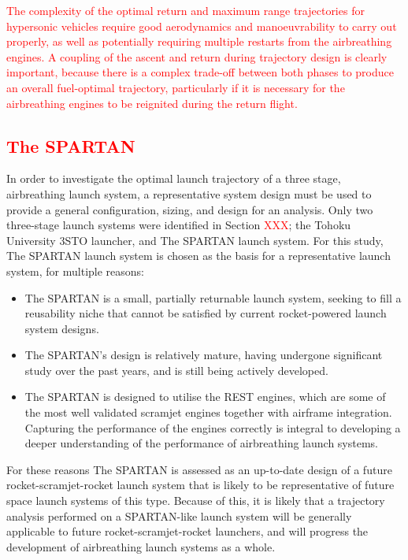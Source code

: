 \textcolor{red}{
The complexity of the optimal return and maximum range trajectories for hypersonic vehicles require good aerodynamics and manoeuvrability to carry out properly, as well as potentially requiring multiple restarts from the airbreathing engines.
	A coupling of the ascent and return during trajectory design is clearly important, because there is a complex trade-off between both phases to produce an overall fuel-optimal trajectory, particularly if it is necessary for the airbreathing engines to be reignited during the return flight. 
}




\textcolor{red}{
\section{The SPARTAN}
}


In order to investigate the optimal launch trajectory of a three stage, airbreathing launch system, a representative system design must be used to provide a general configuration, sizing, and design for an analysis. Only two three-stage launch systems were identified in Section \textcolor{red}{XXX}; the Tohoku University 3STO launcher, and The SPARTAN launch system. For this study, The SPARTAN launch system is chosen as the basis for a representative launch system, for multiple reasons:
\begin{itemize}
	\item The SPARTAN is a small, partially returnable launch system, seeking to fill a reusability niche that cannot be satisfied by current rocket-powered launch system designs.
	\item The SPARTAN's design is relatively mature, having undergone significant study over the past years, and is still being actively developed.
	\item The SPARTAN is designed to utilise the REST engines, which are some of the most well validated scramjet engines together with airframe integration. Capturing the performance of the engines correctly is integral to developing a deeper understanding of the performance of airbreathing launch systems.
\end{itemize}
For these reasons The SPARTAN is assessed as an up-to-date design of a future rocket-scramjet-rocket launch system that is likely to be representative of future space launch systems of this type. Because of this, it is likely that a trajectory analysis performed on a SPARTAN-like launch system will be generally applicable to future rocket-scramjet-rocket launchers, and will progress the development of airbreathing launch systems as a whole. 




